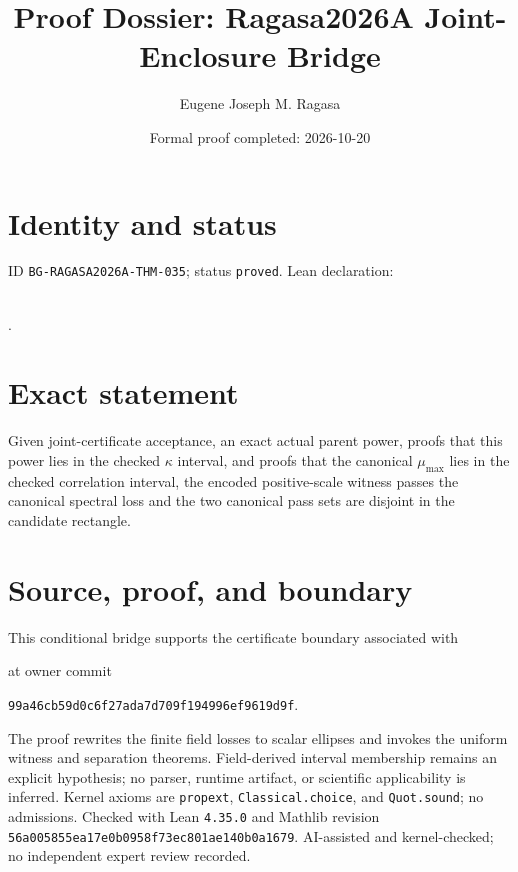 \documentclass[11pt]{article}
\title{Proof Dossier: Ragasa2026A Joint-Enclosure Bridge}\author{Eugene Joseph M. Ragasa}\date{Formal proof completed: 2026-10-20}
\begin{document}
\maketitle
\section{Identity and status}
ID \texttt{BG-RAGASA2026A-THM-035}; status \texttt{proved}. Lean declaration:
\par{}\\
{\tiny{}}.
\section{Exact statement}
Given joint-certificate acceptance, an exact actual parent power, proofs that this power
lies in the checked $\kappa$ interval, and proofs that the canonical $\mu_{\max}$ lies in
the checked correlation interval, the encoded positive-scale witness passes the canonical
spectral loss and the two canonical pass sets are disjoint in the candidate rectangle.
\section{Source, proof, and boundary}
This conditional bridge supports the certificate boundary associated with
\begin{center}\small{}\end{center}
at owner commit
\begin{center}\small\texttt{99a46cb59d0c6f27ada7d709f194996ef9619d9f}.\end{center}
The proof rewrites the finite field losses to scalar ellipses and invokes the uniform
witness and separation theorems. Field-derived interval membership remains an explicit
hypothesis; no parser, runtime artifact, or scientific applicability is inferred. Kernel
axioms are \texttt{propext}, \texttt{Classical.choice}, and \texttt{Quot.sound}; no
admissions. Checked with Lean \texttt{4.35.0} and Mathlib revision
\texttt{56a005855ea17e0b0958f73ec801ae140b0a1679}. AI-assisted and kernel-checked;
no independent expert review recorded.
\end{document}
